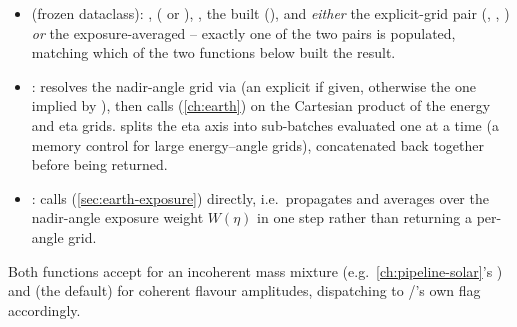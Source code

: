 \begin{implbox}
\begin{itemize}
  \item {} (frozen dataclass): ,
     ( or ), ,
    the built  (),
    and \emph{either} the explicit-grid pair (, ,
    ) \emph{or} the exposure-averaged
     -- exactly one of the two pairs is
    populated, matching which of the two functions below built the result.
  \item {}:
    resolves the nadir-angle grid via
     (an
    explicit  if given, otherwise the one implied by
    ), then calls
     (\cref{ch:earth}) on the Cartesian
    product of the energy and eta grids. 
    splits the eta axis into sub-batches evaluated one at a time (a memory
    control for large energy--angle grids), concatenated back together
    before being returned.
  \item {}: calls
     (\cref{sec:earth-exposure})
    directly, i.e.\ propagates and averages over the nadir-angle exposure
    weight $W(\eta)$ in one step rather than returning a
    per-angle grid.
\end{itemize}
Both functions accept  for an incoherent mass
mixture (e.g.\ \cref{ch:pipeline-solar}'s ) and
 (the default) for coherent flavour amplitudes, dispatching
to /'s
own  flag accordingly.
\end{implbox}

